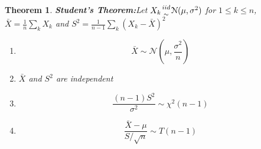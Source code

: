 \documentclass{article}
\newtheorem{theorem}{Theorem}
\theoremstyle{definition}\newtheorem{definition}{DEF}
\theoremstyle{definition}\newtheorem{example}{Ex}
\theoremstyle{lemma}\newtheorem{lemma}{Lemma}
\theoremstyle{corrolary}\newtheorem{corrolary}{Cor}
\begin{document}
\begin{theorem}
\textbf{Student's Theorem:}\label{students_theorem}
Let $X_k {iid \atop \sim } \mathcal{N}(\mu,\sigma^2)$ for $1\leq k \leq n$, $\bar{X}=\frac{1}{n}\sum_k X_k$ and $S^2=\frac{1}{n-1}\sum_k (X_k -\bar{X})^2$
\begin{enumerate}
\item\begin{equation*}
\bar{X}\sim \mathcal{N}\left(\mu, \frac{\sigma^2}{n}\right)
\end{equation*}
\item $\bar{X}$ and $S^2$ are independent
\item
\begin{equation*}
\frac{(n-1)S^2}{\sigma^2} \sim \chi^2(n-1)
\end{equation*}
\item 
\begin{equation*}
\frac{\bar{X}-\mu}{S/\sqrt{n}}\sim T(n-1)
\end{equation*}
\end{enumerate}
\end{theorem}
\end{document}

